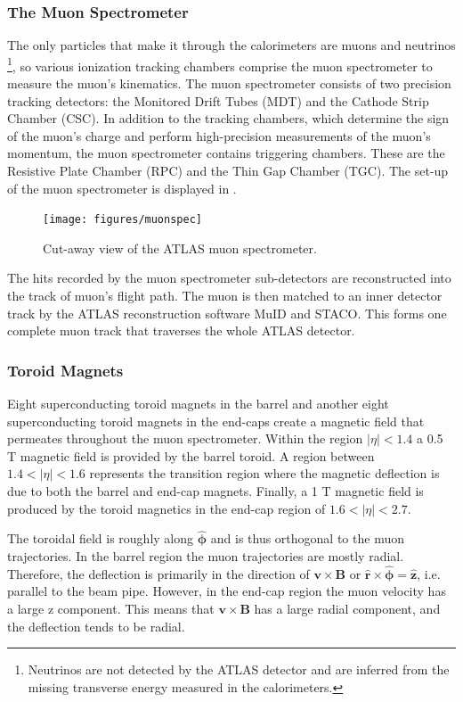 \subsubsection{The Muon Spectrometer}
\label{subsubsec:muonspec}

The only particles that make it through the calorimeters are muons and neutrinos
\footnote{Neutrinos are not detected by the ATLAS detector and are 
inferred from the missing transverse energy measured in the calorimeters.},
so various ionization tracking chambers comprise 
the muon spectrometer to measure the muon's kinematics.
The muon spectrometer consists
of two precision tracking detectors: the Monitored Drift Tubes (MDT) and the
Cathode Strip Chamber (CSC). In addition to the tracking chambers, which
determine the sign of the muon's charge and perform 
high-precision measurements of the muon's momentum, the muon spectrometer 
contains triggering chambers. These are the Resistive Plate Chamber (RPC)
and the Thin Gap Chamber (TGC). The set-up of the muon spectrometer is displayed
in .

\begin{figure}[!hbpt]
  \centering
  \texttt{[image: figures/muonspec]}
  \caption{Cut-away view of the ATLAS muon spectrometer.}
  \label{fig:muonspec}
\end{figure}

The hits recorded by the muon spectrometer sub-detectors are reconstructed into
the track of muon's flight path. The muon is then matched to an inner detector
track by the ATLAS reconstruction software MuID and STACO. This forms one complete
muon track that traverses the whole ATLAS detector.

\subsubsection*{Toroid Magnets}
Eight superconducting toroid magnets in the barrel and another eight 
superconducting toroid magnets in the end-caps create a magnetic field that
permeates throughout the muon spectrometer. Within the region $|\eta| < 1.4$
a 0.5 T magnetic field is provided by the barrel toroid.  A region between
$1.4 < |\eta| < 1.6$ represents the transition region where the magnetic deflection
is due to both the barrel and end-cap magnets. Finally, a 1 T magnetic field
is produced by the toroid magnetics in the end-cap region of $1.6 < |\eta| < 2.7$.

The toroidal field is roughly along $\mathbf{\hat \phi}$ and is thus
orthogonal to the muon trajectories. In the barrel region the muon trajectories
are mostly radial. Therefore, the deflection is primarily in the
direction of $\mathbf{v} \times \mathbf{B}$ or $\mathbf{\hat r} \times \mathbf{\hat \phi} = \mathbf{\hat z}$, i.e. parallel to the beam pipe.
However, in the end-cap region the muon velocity has a large z component. This
means that $\mathbf{v} \times \mathbf{B}$ has a large radial component, and the
deflection tends to be radial.

